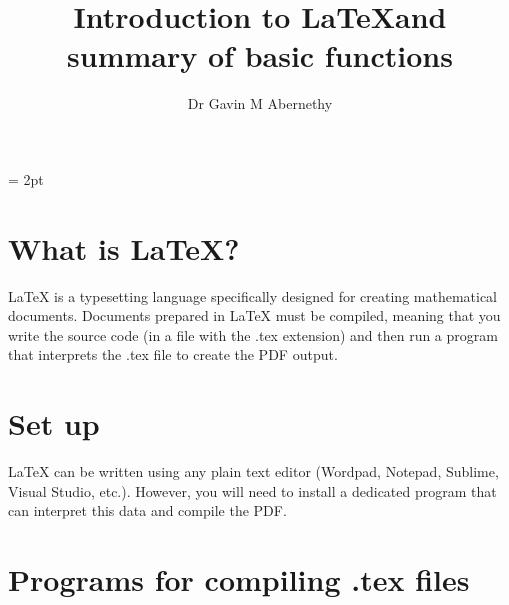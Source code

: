 \documentclass[12pt,fleqn]{article}
\title{\vspace{-6ex}Introduction to \LaTeX and summary of basic functions}
\author{Dr Gavin M Abernethy}
\date{}
\theoremstyle{plain}
\begin{document}
\font=2.5pt
\font= 2pt
\linespread{1.3}
\maketitle



\newpage
\section{What is LaTeX?}
	LaTeX is a typesetting language specifically designed for creating mathematical documents. Documents prepared in LaTeX must be compiled, meaning that you write the source code (in a file with the .tex extension) and then run a program that interprets the .tex file to create the PDF output.
	
	
\section{Set up}

	LaTeX can be written using any plain text editor (Wordpad, Notepad, Sublime, Visual Studio, etc.). However, you will need to install a dedicated program that can interpret this data and compile the PDF.	
	
	\section{Programs for compiling .tex files}
	
\end{document}

